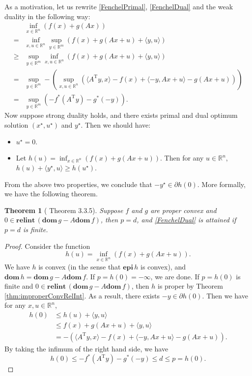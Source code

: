 \documentclass[openany]{book}
\newtheorem{theorem}{Theorem}[chapter]
\theoremstyle{definition}
\theoremstyle{remark}
\begin{document}
As a motivation, let us rewrite \eqref{FenchelPrimal}, \eqref{FenchelDual} and the weak duality in the following way:
\begin{align*}
     & \inf_{x\in \mathbb{R}^n}\left(f(x)+g(Ax)\right) \\
    = & \inf_{x,u\in \mathbb{R}^n}\sup_{y\in \mathbb{R}^m}\left(f(x)+g(Ax+u)+\langle y,u\rangle\right) \\
    \ge & \sup_{y\in \mathbb{R}^m}\inf_{x,u\in \mathbb{R}^n}\left(f(x)+g(Ax+u)+\langle y,u\rangle\right) \\
    = & \sup_{y\in \mathbb{R}^m}-\left(\sup_{x,u\in \mathbb{R}^n}\left(\langle A^{\mathrm{T}}y,x\rangle-f(x)+\langle -y,Ax+u\rangle-g(Ax+u)\right)\right) \\
    = & \sup_{y\in \mathbb{R}^m}\left(-f^*(A^{\mathrm{T}}y)-g^*(-y)\right).
\end{align*}
Now suppose strong duality holds, and there exists primal and dual optimum solution $(x^{\star},u^{\star})$ and $y^{\star}$. Then we should have:
\begin{itemize}
    \item $u^{\star}=0$.
    \item Let $h(u)=\inf_{x\in \mathbb{R}^n}\left(f(x)+g(Ax+u)\right)$. Then for any $u\in \mathbb{R}^n$, $h(u)+\langle y^{\star},u\rangle\ge h(u^{\star})$.
\end{itemize}
From the above two properties, we conclude that $-y^{\star}\in\partial h(0)$. More formally, we have the following theorem.
\begin{theorem}[\cite{BL10} Theorem 3.3.5]\label{thm:FenchelStrongDual}
    Suppose $f$ and $g$ are proper convex and $0\in \mathbf{relint}\,(\mathbf{dom}\,g-A \mathbf{dom}\,f)$, then $p=d$, and \eqref{FenchelDual} is attained if $p=d$ is finite.
\end{theorem}
\begin{proof}
    Consider the function
    \begin{equation*}
        h(u)=\inf_{x\in \mathbb{R}^n}\left(f(x)+g(Ax+u)\right).
    \end{equation*}
    We have $h$ is convex (in the sense that $\mathbf{epi}\,h$ is convex), and $\mathbf{dom}\,h=\mathbf{dom}\,g-A \mathbf{dom}\,f$. If $p=h(0)=-\infty$, we are done. If $p=h(0)$ is finite and $0\in \mathbf{relint}\,(\mathbf{dom}\,g-A \mathbf{dom}\,f)$, then $h$ is proper by Theorem \ref{thm:improperConvRelInt}. As a result, there exists $-y\in\partial h(0)$. Then we have for any $x,u\in \mathbb{R}^n$,
    \begin{align*}
        h(0) &\le h(u)+\langle y,u\rangle \\
         & \le f(x)+g(Ax+u)+\langle y,u\rangle \\
         & =-\left(\langle A^{\mathrm{T}}y,x\rangle-f(x)+\langle -y,Ax+u\rangle-g(Ax+u)\right).
    \end{align*}
    By taking the infimum of the right hand side, we have
    \begin{equation*}
        h(0)\le-f^*(A^{\mathrm{T}}y)-g^*(-y)\le d\le p=h(0).
    \end{equation*}
\end{proof}
\end{document}
